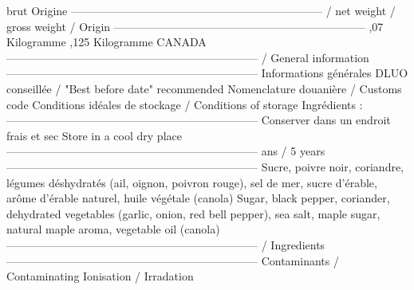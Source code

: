 brut \newline Origine  \newline -------------------------------------------------------------------- \newline / net weight \newline / gross weight \newline / Origin \newline -------------------------------------------------------------------- ,07 Kilogramme ,125 Kilogramme \newline CANADA \newline -------------------------------------------------------------------- \newline / General information \newline -------------------------------------------------------------------- \newline Informations générales \newline DLUO conseillée / "Best before date" recommended \newline Nomenclature douanière / Customs code \newline Conditions idéales de stockage  \newline / Conditions of storage \newline Ingrédients :  \newline -------------------------------------------------------------------- \newline Conserver dans un endroit frais et sec \newline Store in a cool dry place \newline --------------------------------------------------------------------  ans / 5 years  \newline -------------------------------------------------------------------- \newline Sucre, poivre noir, coriandre, légumes déshydratés (ail, oignon, \newline poivron rouge), sel de mer, sucre d'érable, arôme d'érable naturel, \newline huile végétale (canola) \newline Sugar, black pepper, coriander, dehydrated vegetables (garlic, onion, \newline red bell pepper), sea salt, maple sugar, natural maple aroma, \newline vegetable oil (canola) \newline -------------------------------------------------------------------- \newline / Ingredients \newline -------------------------------------------------------------------- \newline Contaminants / Contaminating \newline Ionisation /  Irradation \newline 